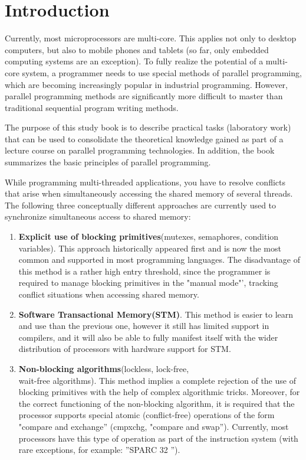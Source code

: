 { %
	\section*{Introduction}
	\par Currently, most microprocessors are multi-core. This applies not only to desktop computers, but also to mobile phones and tablets (so far, only embedded computing systems are an exception). To fully realize the potential of a multi-core system, a programmer needs to use special methods of parallel programming, which are becoming increasingly popular in industrial programming. However, parallel programming methods are significantly more difficult to master than traditional sequential program writing methods.
	\par The purpose of this study book is to describe practical tasks (laboratory work) that can be used to consolidate the theoretical knowledge gained as part of a lecture course on parallel programming technologies. In addition, the book summarizes the basic principles of parallel programming.%
	\par While programming multi-threaded applications, you have to resolve conflicts that arise when simultaneously accessing the shared memory of several threads. The following three conceptually different approaches are currently used to synchronize simultaneous access to shared memory:
	\begin{enumerate}
		\item\textbf{Explicit use of blocking primitives}\quad(mutexes, semaphores, condition variables). This approach historically appeared first and is now the most common and supported in most programming languages. The disadvantage of this method is a rather high entry threshold, since the programmer is required to manage blocking primitives in the  "manual mode"', tracking conflict situations when accessing shared memory.
		\item\textbf{Software Transactional Memory(STM)}. This method is easier to learn and use than the previous one, however it still has limited support in compilers, and it will also be able to fully manifest itself with the wider distribution of processors with hardware support for STM.
		\item\textbf{Non-blocking algorithms}\quad(lockless, lock-free,\\wait-free algorithms). This method implies a complete rejection of the use of blocking primitives with the help of complex algorithmic tricks. Moreover, for the correct functioning of the non-blocking algorithm, it is required that the processor supports special atomic (conflict-free) operations of the form "compare and exchange'' (cmpxchg, "compare and swap''). Currently, most processors have this type of operation as part of the instruction system (with rare exceptions, for example: ''SPARC 32 '').

\end{enumerate}}
